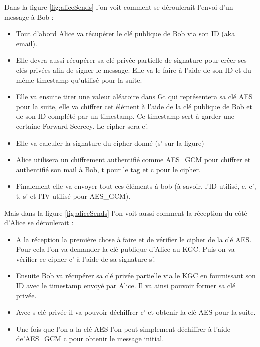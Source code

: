 Dans la figure \ref{fig:aliceSends} l'on voit comment se déroulerait l'envoi d'un message à Bob : 
\begin{itemize}
	\item Tout d'abord Alice va récupérer le clé publique de Bob via son ID (aka email).
	\item Elle devra aussi récupérer sa clé privée partielle de signature pour créer ses clés privées afin de signer le message. Elle va le faire à l'aide de son ID et du même timestamp qu'utilisé pour la suite.
	\item Elle va ensuite tirer une valeur aléatoire dans Gt qui représentera sa clé AES pour la suite, elle va chiffrer cet élément à l'aide de la clé publique de Bob et de son ID complété par un timestamp. Ce timestamp sert à garder une certaine Forward Secrecy. Le cipher sera c'.
	\item Elle va calculer la signature du cipher donné (s' sur la figure)
	\item Alice utilisera un chiffrement authentifié comme AES\_GCM pour chiffrer et authentifié son mail à Bob, t pour le tag et c pour le cipher.
	\item Finalement elle va envoyer tout ces éléments à bob (à savoir, l'ID utilisé, c, c', t, s' et l'IV utilisé pour AES\_GCM).
\end{itemize}
Mais dans la figure \ref{fig:aliceSends} l'on voit aussi comment la réception du côté d'Alice se déroulerait :
\begin{itemize}
	\item A la réception la première chose à faire et de vérifier le cipher de la clé AES. Pour cela l'on va demander la clé publique d'Alice au KGC. Puis on va vérifier ce cipher c' à l'aide de sa signature s'.
	\item Ensuite Bob va récupérer sa clé privée partielle via le KGC en fournissant son ID avec le timestamp envoyé par Alice. Il va ainsi pouvoir former sa clé privée.
	\item Avec s clé privée il va pouvoir déchiffrer c' et obtenir la clé AES pour la suite.
	\item Une fois que l'on a la clé AES l'on peut simplement déchiffrer à l'aide de'AES\_GCM c pour obtenir le message initial.
\end{itemize}

